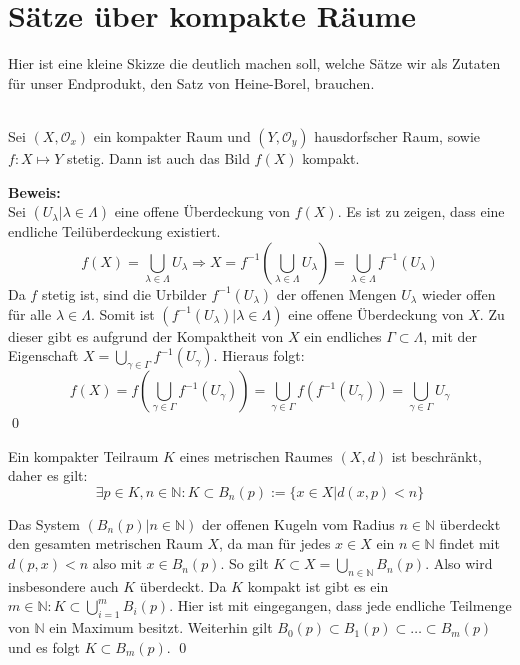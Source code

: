 \chapter{Sätze über kompakte Räume}
%
Hier ist eine kleine Skizze die deutlich machen soll, welche Sätze wir als Zutaten für unser Endprodukt, den \glqq Satz von Heine-Borel\grqq, brauchen. \\
%
\\

%
\begin{Satz}
Sei \( (X, \mathcal{O}_x) \) ein kompakter Raum und \((Y, \mathcal{O}_y)\) hausdorfscher Raum, sowie \(f: X \mapsto Y\) stetig.
Dann ist auch das Bild \( f(X) \) kompakt.
\end{Satz}
%
\textbf{Beweis:}
	\\
	Sei \( (U_{\lambda} | \lambda \in \Lambda) \) eine offene Überdeckung von \(f(X)\). Es ist zu zeigen,
	dass eine endliche Teilüberdeckung existiert. 
	\[ f(X) = \bigcup_{\lambda \in \Lambda} U_{\lambda} \Rightarrow X = 
  	 f^{-1}(\bigcup_{\lambda \in \Lambda} U_{\lambda}) = 
		 \bigcup_{\lambda \in \Lambda} f^{-1}(U_{\lambda}) \]
	Da \(f\) stetig ist, sind die Urbilder \( f^{-1}(U_{\lambda}) \) der offenen Mengen \(U_{\lambda}\) wieder offen für 
	alle \(\lambda \in \Lambda\). Somit ist \( ( f^{-1}(U_{\lambda}) | \lambda \in \Lambda ) \) eine offene Überdeckung
	von \(X\). Zu dieser gibt es aufgrund der Kompaktheit von \(X\) ein endliches \( \Gamma \subset \Lambda \), mit 
	der Eigenschaft \( X = \bigcup_{\gamma \in \Gamma} f^{-1}(U_{\gamma}) \). Hieraus folgt:
	\[ f(X) = f(\bigcup_{\gamma \in \Gamma} f^{-1}(U_{\gamma})) = 
  	 \bigcup_{\gamma \in \Gamma} f(f^{-1}(U_{\gamma})) = 
	   \bigcup_{\gamma \in \Gamma} U_{\gamma} \]
\qed

\begin{Satz}
	Ein kompakter Teilraum \(K\) eines metrischen Raumes \( (X, d) \) ist beschränkt, daher es gilt:
	\[ \exists p \in K, n \in \mathbb{N} : K \subset B_n(p) := \{ x \in X | d(x,p) < n \} \]
\end{Satz}
Das System \( (B_{n}(p) | n \in \mathbb{N}) \) der offenen Kugeln vom Radius \(n \in \mathbb{N}\) überdeckt 
den gesamten metrischen Raum \(X\), da man für jedes \(x \in X\) ein \(n \in \mathbb{N}\) findet mit \(d(p,x) < n\)
also mit \(x \in B_{n}(p)\).
So gilt \(K \subset X = \bigcup_{n \in \mathbb{N}} B_{n}(p)\). 
Also wird insbesondere auch \(K\) überdeckt. 
Da \(K\) kompakt ist gibt es ein \(m \in \mathbb{N} : K \subset \bigcup_{i=1}^{m} B_{i}(p) \). Hier ist
mit eingegangen, dass jede endliche Teilmenge von \(\mathbb{N}\) ein Maximum besitzt.
Weiterhin gilt \( B_0(p) \subset B_1(p) \subset \dots \subset B_m(p) \) und es folgt \(K \subset B_m(p)\).
\qed

